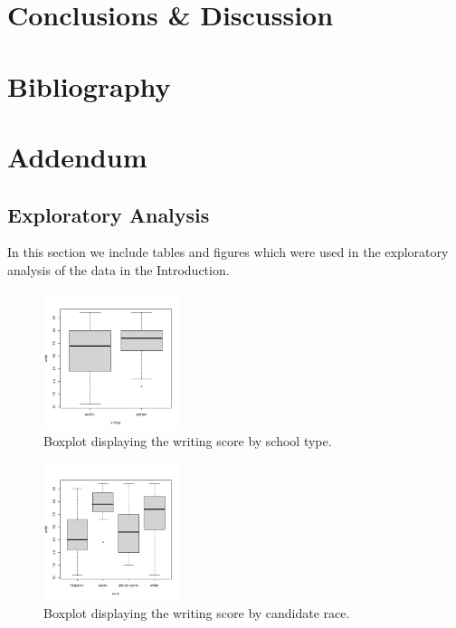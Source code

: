 \documentclass[10pt]{article}
\begin{document}
	

	
	\section{Conclusions \& Discussion}
	\label{sec::conclusions}
	\lipsum[23-28]
	
	\section{Bibliography}
	\printbibliography
	
	\section{Addendum}
	\label{sec::addendum}
	
	\subsection{Exploratory Analysis}
	In this section we include tables and figures which were used in the exploratory analysis of the data in the Introduction. 
	
	\begin{figure}
		\includegraphics[width=4cm]{write_schtyp_boxplot.png}
		\centering
		\caption{Boxplot displaying the writing score by school type.}
		\label{fig::write_schtyp_boxplot}
	\end{figure}
	
	\begin{figure}
		\includegraphics[width=4cm]{write_race_boxplot.png}
		\centering
		\caption{Boxplot displaying the writing score by candidate race.}
		\label{fig::write_race_boxplot}
	\end{figure}
	
\end{document}

